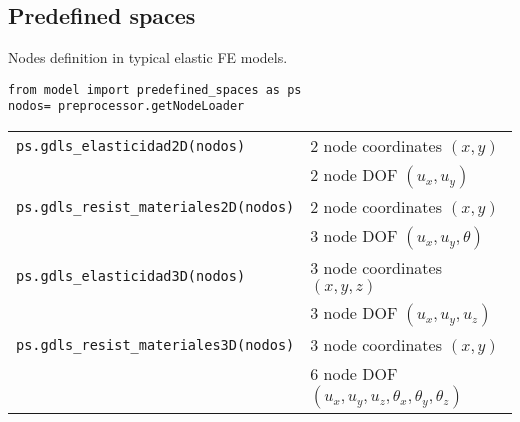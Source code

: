 \subsection{Predefined spaces}
Nodes definition in typical elastic FE models.
\begin{verbatim}
from model import predefined_spaces as ps
nodos= preprocessor.getNodeLoader
\end{verbatim}
\begin{center} 
\begin{longtable}{ll}
{\tt ps.gdls\_elasticidad2D(nodos)} & 2 node coordinates $(x,y)$ \\
                                    & 2 node DOF $(u_x,u_y)$ \\ 
{\tt ps.gdls\_resist\_materiales2D(nodos)} & 2 node coordinates $(x,y)$ \\
                                    & 3 node DOF $(u_x,u_y,\theta)$ \\ 
{\tt ps.gdls\_elasticidad3D(nodos)} & 3 node coordinates $(x,y,z)$ \\
                                    & 3 node DOF $(u_x,u_y,u_z)$ \\ 
{\tt ps.gdls\_resist\_materiales3D(nodos)} & 3 node coordinates $(x,y)$ \\
                                    & 6 node DOF $(u_x,u_y,u_z,\theta_x,\theta_y,\theta_z)$ \\ 
\end{longtable} \end{center}

